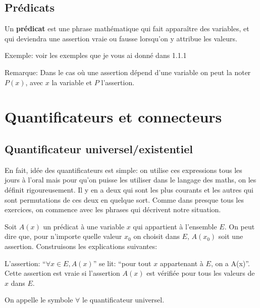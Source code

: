 \documentclass{article}
\begin{document}
\subsection{Prédicats}

\begin{tcolorbox}[colback=red!5!white,colframe=red!75!black,title=Définition 1.3]
  Un \textbf{prédicat} est une phrase mathématique qui fait apparaître des variables, et qui deviendra une assertion vraie ou fausse lorsqu'on y attribue les valeurs.
\end{tcolorbox}

Exemple: voir les exemples que je vous ai donné dans 1.1.1

Remarque: Dans le cas où une assertion dépend d'une variable on peut la noter $P(x)$, avec $x$ la variable et $P$ l'assertion.

\section{Quantificateurs et connecteurs}
\subsection{Quantificateur universel/existentiel}

En fait, idée des quantificateurs est simple: on utilise ces expressions tous les jours à l'oral mais pour qu'on puisse les utiliser dans le langage des maths, on les définit rigoureusement. Il y en a deux qui sont les plus courants et les autres qui sont permutations de ces deux en quelque sort. Comme dans presque tous les exercices, on commence avec les phrases qui décrivent notre situation.

Soit $A(x)$ un prédicat à une variable $x$ qui appartient à l'ensemble $E$. On peut dire que, pour n'importe quelle valeur $x_{0}$ on choisit dans $E$, $A(x_{0})$ soit une assertion. Construisons les explications suivantes:

\begin{tcolorbox}[colback=red!5!white,colframe=red!75!black,title=Définition 1.4]

L'assertion: ``$\forall x \in E, A(x)$'' se lit: ``pour tout $x$ appartenant à $E$, on a A(x)''. Cette assertion est vraie si l'assertion $A(x)$ est vérifiée pour tous les valeurs de $x$ dans $E$.

\tcblower

On appelle le symbole $\forall$ le quantificateur universel.

\end{tcolorbox}
\end{document}
